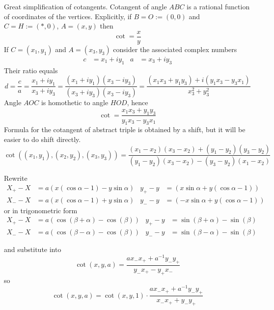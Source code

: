 \documentclass[12pt]{article}
\numberwithin{equation}{section}
\begin{document}
Great simplification of cotangents.
Cotangent of angle $ABC$ is a rational function of coordinates of the vertices.
Explicitly, if $B=O:=(0,0)$ and $C=H:=(*,0)$, $A=(x,y)$ then
\[ \cot = \frac{x}{y} \]
If $C=(x_1,y_1)$ and $A=(x_3,y_3)$ consider the associated complex numbers 
\begin{align*} 
c &= x_1 + i y_1 & 
a &= x_3 + i y_3
\end{align*}
Their ratio equals
\[ d = \frac{c}{a} 
 = \frac{x_1 + i y_1}{x_3 + i y_3} 
 = \frac{(x_1 + i y_1)(x_3 - i y_3)}{(x_3 + i y_3)(x_3 - i y_3)} 
 = \frac{(x_1 x_3 + y_1 y_3) + i (y_1 x_3 - y_3 x_1)}{x_3^2 + y_3^2}
\]
Angle $AOC$ is homothetic to angle $HOD$, hence
\begin{equation} \label{cotangent}
\cot = \frac{x_1 x_3 + y_1 y_3}{y_1 x_3 - y_3 x_1} 
\end{equation}
Formula for the cotangent of abstract triple is obtained by a shift, but it will be easier to do shift directly.
\begin{equation*} 
\cot((x_1,y_1),(x_2,y_2),(x_3,y_3)) = 
\frac{(x_1-x_2) (x_3-x_2) + (y_1-y_2) (y_3-y_2)}{(y_1-y_2) (x_3-x_2) - (y_3-y_2) (x_1-x_2)}
\end{equation*}


Rewrite  
\begin{align}
X_+ - X &= a (x (\cos α - 1) - y \sin α)    &     y_+ - y &= ( x \sin α + y (\cos α - 1))  \\
X_- - X &= a (x (\cos α - 1) + y \sin α)    &     y_- - y &= (-x \sin α + y (\cos α - 1))  
\end{align}
or in trigonometric form
\begin{align}
X_+ - X &= a (\cos(β+α)-\cos(β))    &     y_+ - y &= \sin(β+α)-\sin(β)  \\
X_- - X &= a (\cos(β-α)-\cos(β))    &     y_- - y &= \sin(β-α)-\sin(β)  
\end{align}


and substitute into 
\begin{equation} \label{cot-a}
\cot(x,y,a) = \frac{a x_- x_+ + a^{-1} y_- y_+}{y_- x_+ - y_+ x_-}
\end{equation}
so
\begin{equation}
\cot(x,y,a) = \cot(x,y,1) \cdot \frac{a x_- x_+ + a^{-1} y_- y_+}{x_- x_+ + y_- y_+}
\end{equation}
\end{document}
